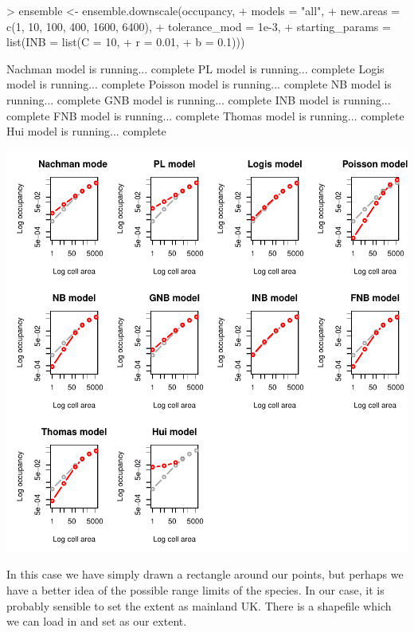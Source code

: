 \documentclass{article}[12pt, a4paper]
\begin{document}
\begin{Schunk}
\begin{Sinput}
> ensemble <- ensemble.downscale(occupancy,
+                                models = "all",
+                                new.areas = c(1, 10, 100, 400, 1600, 6400),
+                                tolerance_mod = 1e-3,
+                                starting_params = list(INB = list(C = 10, 
+                                                                  r = 0.01, 
+                                                                  b = 0.1)))
\end{Sinput}
\begin{Soutput}
Nachman model is running...  complete 
PL model is running...  complete 
Logis model is running...  complete 
Poisson model is running...  complete 
NB model is running...  complete 
GNB model is running...  complete 
INB model is running...  complete 
FNB model is running...  complete 
Thomas model is running...  complete 
Hui model is running...  complete 

\end{Soutput}
\end{Schunk}
\includegraphics{Downscaling-downscale36}

In this case we have simply drawn a rectangle around our points, but perhaps we have a better idea of the possible range limits of the species. In our case, it is probably sensible to set the extent as mainland UK. There is a shapefile which we can load in and set as our extent.
\end{document}
